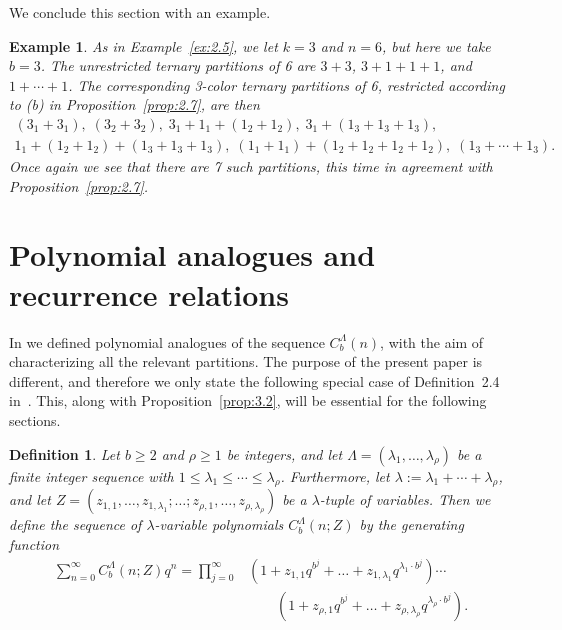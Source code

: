 \documentclass{amsart}
\theoremstyle{plain}
\newtheorem{definition}[theorem]{Definition}
\newtheorem{example}[theorem]{Example}
\numberwithin{equation}{section}
\begin{document}
We conclude this section with an example.

\begin{example}\label{ex:2.8}
{\rm As in Example~\ref{ex:2.5}, we let $k=3$ and $n=6$, but here we take $b=3$.
The unrestricted ternary partitions of 6 are $3+3$, $3+1+1+1$, and $1+\cdots+1$.
The corresponding 3-color ternary partitions of 6, restricted according to (b)
in Proposition~\ref{prop:2.7}, are then
\begin{gather*}
(3_1+3_1),\; (3_2+3_2),\; 3_1+1_1+(1_2+1_2),\; 3_1+(1_3+1_3+1_3),\\
1_1+(1_2+1_2)+(1_3+1_3+1_3),\; (1_1+1_1)+(1_2+1_2+1_2+1_2),\; (1_3+\cdots+1_3).
\end{gather*}
Once again we see that there are 7 such partitions, this time in agreement 
with Proposition~\ref{prop:2.7}}.
\end{example}

\section{Polynomial analogues and recurrence relations}\label{sec:3}


In \cite{DE10} we defined polynomial analogues of the sequence
$C_b^\Lambda(n)$, with the aim of characterizing all the relevant partitions.
The purpose of the present paper is different, and therefore we only state
the following special case of Definition~2.4 in~\cite{DE10}. This, along with
Proposition~\ref{prop:3.2}, will be essential for the following sections.

\begin{definition}\label{def:3.1}
Let $b\geq 2$ and $\rho\geq 1$ be integers, and let
$\Lambda=(\lambda_1,\ldots,\lambda_\rho)$ be a finite integer sequence with
$1\leq\lambda_1\leq\cdots\leq\lambda_\rho$. Furthermore, let
$\lambda:=\lambda_1+\cdots+\lambda_\rho$, and let
$Z=(z_{1,1},\ldots,z_{1,\lambda_1};\ldots;z_{\rho,1},\ldots,z_{\rho,\lambda_\rho})$
be a $\lambda$-tuple of variables. Then we define the sequence of
$\lambda$-variable polynomials $C_b^\Lambda(n;Z)$ by the generating function
\begin{align}
\sum_{n=0}^\infty C_b^\Lambda(n;Z)q^n
=\prod_{j=0}^\infty&\left(1+z_{1,1}q^{b^j}+\dots
+z_{1,\lambda_1}q^{\lambda_1\cdot b^j}\right)\cdots\label{3.1}\\
&\qquad\left(1+z_{\rho,1}q^{b^j}+\dots
+z_{\rho,\lambda_\rho}q^{\lambda_\rho\cdot b^j}\right).\nonumber
\end{align}
\end{definition}
\end{document}
